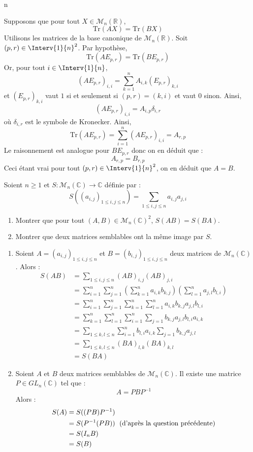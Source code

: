 n\documentclass[a4paper,10pt]{report}
\begin{document}
\corr Supposons que pour tout $X \in \mathcal{M}_n(\mathbb{R})$, 
$$\textrm{Tr}(AX)= \textrm{Tr}(BX)$$
Utilisons les matrices de la base canonique de $\mathcal{M}_n(\mathbb{R})$. Soit $(p,r) \in \Interv{1}{n}^2$. Par hypothèse,
$$ \textrm{Tr}(AE_{p,r})= \textrm{Tr}(BE_{p,r})$$
Or, pour tout $i \in \Interv{1}{n}$,
$$ (A E_{p,r})_{i,i} = \sum_{k=1}^n A_{i,k} (E_{p,r})_{k,i} $$
et $(E_{p,r})_{k,i}$ vaut $1$ si et seulement si $(p,r)=(k,i)$ et vaut $0$ sinon. Ainsi,
$$ (A E_{p,r})_{i,i} = A_{i,p} \delta_{i,r}$$
où $\delta_{i,r}$ est le symbole de Kronecker. Ainsi,
 $$ \textrm{Tr}(AE_{p,r}) = \sum_{i=1}^n (A E_{p,r})_{i,i} = A_{r,p}$$
 Le raisonnement est analogue pour $B E_{p,r}$ donc on en déduit que :
 $$ A_{r,p}= B_{r,p}$$
 Ceci étant vrai pour tout $(p,r) \in \Interv{1}{n}^2$, on en déduit que $A=B$.

\begin{Exa} Soient $n \geq 1$ et $S : \mathcal{M}_n(\mathbb{C}) \rightarrow \mathbb{C}$ définie par :
$$ S((a_{i,j})_{1 \leq i,j \leq n}) = \sum_{1 \leq i,j \leq n} a_{i,j} a_{j,i}$$

\begin{enumerate}
\item Montrer que pour tout $(A,B) \in \mathcal{M}_n(\mathbb{C})^2$, $S(AB)=S(BA)$.
\item Montrer que deux matrices semblables ont la même image par $S$.
\end{enumerate}
\end{Exa}

\corr 

\begin{enumerate}
\item Soient $A=(a_{i,j})_{1 \leq i,j \leq n}$ et $B= (b_{i,j})_{1 \leq i,j \leq n}$  deux matrices de $\mathcal{M}_n(\mathbb{C})$. Alors :
\begin{align*}
S(AB) & =  \sum_{1 \leq i,j \leq n} (AB)_{i,j} (AB)_{j,i} \\
& = \sum_{i=1}^n \sum_{j=1}^n \left( \sum_{k=1}^n a_{i,k} b_{k,j} \right) \left( \sum_{l=1}^n a_{j,l} b_{l,i} \right) \\
& =  \sum_{i=1}^n \sum_{j=1}^n \sum_{k=1}^n \sum_{l=1}^n a_{i,k} b_{k,j} a_{j,l} b_{l,i} \\
& = \sum_{k=1}^n \sum_{l=1}^n \sum_{i=1}^n \sum_{j=1} b_{k,j} a_{j,l} b_{l,i} a_{i,k} \\
& = \sum_{1 \leq k,l \leq n} \sum_{i=1}^n  b_{l,i} a_{i,k}  \sum_{j=1} b_{k,j} a_{j,l} \\
& = \sum_{1 \leq k,l \leq n} (BA)_{l,k} (BA)_{k,l} \\
& = S(BA) 
\end{align*}
\item Soient $A$ et $B$ deux matrices semblables de $\mathcal{M}_n(\mathbb{C})$. Il existe une matrice $P \in GL_n(\mathbb{C})$ tel que :
$$ A=PBP^{-1}$$
Alors :
\begin{align*}
S(A) & = S((PB)P^{-1}) \\
& = S(P^{-1} (PB)) \; \hbox{ (d'après la question précédente)} \\
& = S(I_n B) \\
& = S(B)
\end{align*}
\end{enumerate}
\end{document}
